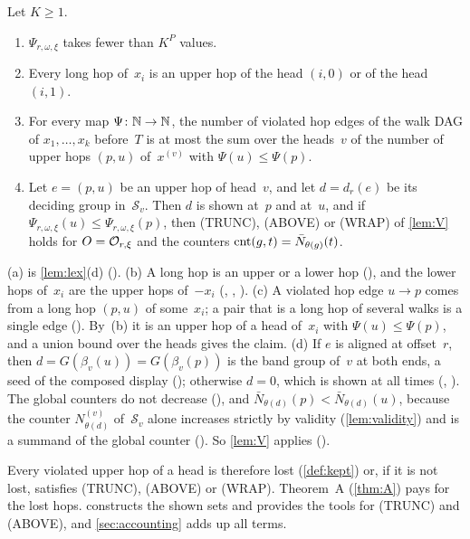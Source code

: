 \begin{lemma}\label{lem:heads}
Let $K\ge1$.
\begin{enumerate}[label=(\alph*)]
\item $\Psi_{r,\omega,\xi}$ takes fewer than $K^P$ values.
\item Every long hop of~$x_i$ is an upper hop of the head $(i,0)$ or of the head $(i,1)$.
\item For every map $\Psi\colon\mathbb{N}\to\mathbb{N}$, the number of violated hop edges of the walk DAG of $x_1,\dots,x_k$ before~$T$ is at
most the sum over the heads~$v$ of the number of upper hops $(p,u)$ of~$x^{(v)}$ with $\Psi(u)\le\Psi(p)$.
\item Let $e=(p,u)$ be an upper hop of head~$v$, and let $d=d_r(e)$ be its deciding group in~$\mathcal S_v$. Then $d$ is shown
at~$p$ and at~$u$, and if $\Psi_{r,\omega,\xi}(u)\le\Psi_{r,\omega,\xi}(p)$, then (TRUNC), (ABOVE) or (WRAP) of \cref{lem:V} holds
for $O=\mathcal{O}_{r,\xi}$ and the counters $\mathrm{cnt}(g,t)=\bar N_{\theta(g)}(t)$.
\end{enumerate}
\end{lemma}

\begin{outline}
(a) is \cref{lem:lex}(d) (). (b) A long hop is an upper or a lower hop (), and the
lower hops of~$x_i$ are the upper hops of~$-x_i$ (, , ). (c) A violated
hop edge $u\to p$ comes from a long hop $(p,u)$ of some~$x_i$; a pair that is a long hop of several walks is a single edge
(). By~(b) it is an upper hop of a head of~$x_i$ with $\Psi(u)\le\Psi(p)$, and a union bound over the
heads gives the claim. (d) If $e$ is aligned at offset~$r$, then $d=G(\beta_v(u))=G(\beta_v(p))$ is the band group of~$v$ at both
ends, a seed of the composed display (); otherwise $d=0$, which is shown at all times
(, ). The global counters do not decrease (), and
$\bar N_{\theta(d)}(p)<\bar N_{\theta(d)}(u)$, because the counter $N^{(v)}_{\theta(d)}$ of~$\mathcal S_v$ alone increases
strictly by validity (\cref{lem:validity}) and is a summand of the global counter (). So
\cref{lem:V} applies ().
\end{outline}

Every violated upper hop of a head is therefore lost (\cref{def:kept}) or, if it is not lost, satisfies (TRUNC), (ABOVE) or
(WRAP). Theorem~A (\cref{thm:A}) pays for the lost hops.  constructs the shown sets and provides the tools for
(TRUNC) and (ABOVE), and \cref{sec:accounting} adds up all terms.
